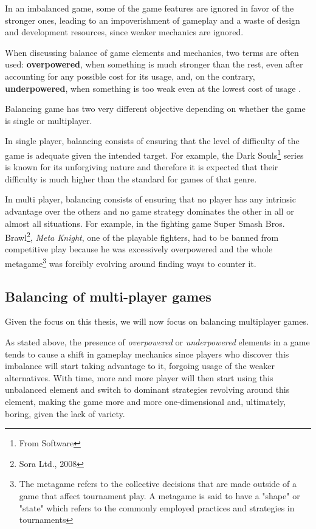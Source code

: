 In an imbalanced game, some of the game features are ignored in favor of the stronger ones, leading to an impoverishment of gameplay and a waste of design and development resources, since weaker mechanics are ignored.

When discussing balance of game elements and mechanics, two terms are often used: \textbf{overpowered}, when something is much stronger than the rest, even after accounting for any possible cost for its usage, and, on the contrary, \textbf{underpowered}, when something is too weak even at the lowest cost of usage \cite{game_balance_concepts}.

Balancing game has two very different objective depending on whether the game is single or multiplayer.
 
In single player, balancing consists of ensuring that the level of difficulty of the game is adequate given the intended target. For example, the Dark Souls\footnote{From Software} series is known for its unforgiving nature and therefore it is expected that their difficulty is much higher than the standard for games of that genre.

In multi player, balancing consists of ensuring that no player has any intrinsic advantage over the others and no game strategy dominates the other in all or almost all situations. For example, in the fighting game Super Smash Bros. Brawl\footnote{Sora Ltd., 2008}, \textit{Meta Knight}, one of the playable fighters, had to be banned from competitive play because he was excessively overpowered and the whole metagame\footnote{The metagame refers to the collective decisions that are made outside of a game that affect tournament play. A metagame is said to have a "shape" or "state" which refers to the commonly employed practices and strategies in tournaments} was forcibly evolving around finding ways to counter it.

\subsection{Balancing of multi-player games}
Given the focus on this thesis, we will now focus on balancing multiplayer games.

As stated above, the presence of \textit{overpowered} or \textit{underpowered} elements in a game tends to cause a shift in gameplay mechanics since players who discover this imbalance will start taking advantage to it, forgoing usage of the weaker alternatives. With time, more and more player will then start using this unbalanced element and switch to dominant strategies revolving around this element, making the game more and more one-dimensional and, ultimately, boring, given the lack of variety.

